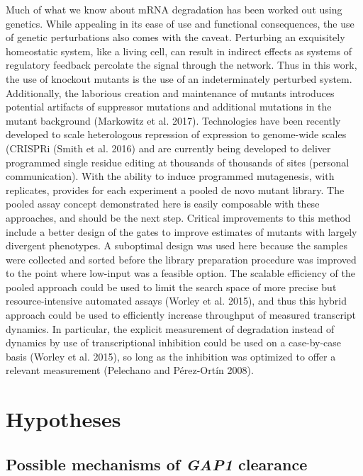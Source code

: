 Much of what we know about mRNA
degradation has been worked out using genetics. While appealing in its
ease of use and functional consequences, the use of genetic
perturbations also comes with the caveat. Perturbing an exquisitely
homeostatic system, like a living cell, can result in indirect effects
as systems of regulatory feedback percolate the signal through the
network. Thus in this work, the use of knockout mutants is the use of
an indeterminately perturbed system. Additionally, the laborious
creation and maintenance of mutants introduces potential artifacts of
suppressor mutations and additional mutations in the mutant background
(Markowitz et al. 2017). Technologies have been recently developed to
scale heterologous repression of expression to genome-wide scales
(CRISPRi (Smith et al. 2016) and are currently being developed to
deliver programmed single residue editing at thousands of thousands of
sites (personal communication). With the ability to induce programmed
mutagenesis, with  replicates, provides for each experiment a pooled
de novo mutant library. The pooled assay concept demonstrated here is
easily composable with these approaches, and should be the next step.
Critical improvements to this method include a better design of the
gates to improve estimates of mutants with largely divergent
phenotypes. A suboptimal design was used here because the samples were
collected and sorted before the library preparation procedure was
improved to the point where low-input was a feasible option.  The
scalable efficiency of the pooled approach could be used to limit the
search space of more precise but resource-intensive automated assays
(Worley et al. 2015), and thus this hybrid approach could be used to
efficiently increase throughput of measured transcript dynamics. In
particular, the explicit measurement of degradation instead of
dynamics by use of transcriptional inhibition could be used on a
case-by-case basis (Worley et al. 2015), so long as the inhibition was
optimized to offer a relevant measurement (Pelechano and Pérez-Ortín
2008).

\section{Hypotheses}

\subsection{Possible mechanisms of \textit{GAP1} clearance}

